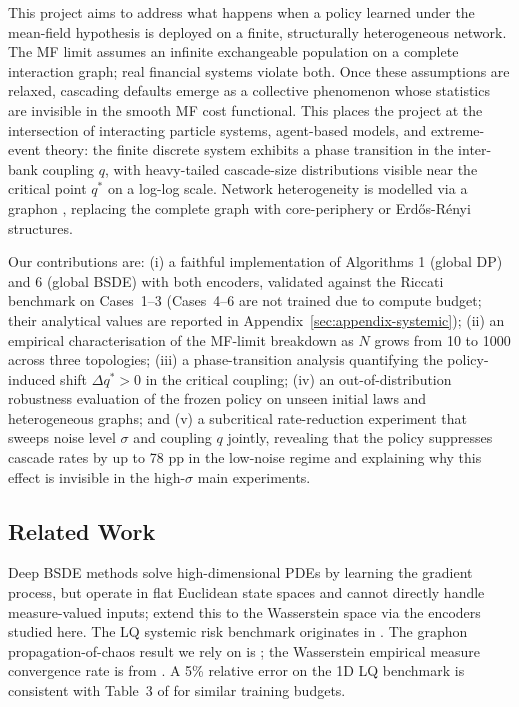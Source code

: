 \documentclass[11pt]{article}
\begin{document}
This project aims to address what happens when a policy learned under the mean-field hypothesis is deployed on a finite, structurally heterogeneous network. The MF limit assumes an infinite exchangeable population on a complete interaction graph; real financial systems violate both. Once these assumptions are relaxed, cascading defaults emerge as a collective phenomenon whose statistics are invisible in the smooth MF cost functional. This places the project at the intersection of interacting particle systems, agent-based models, and extreme-event theory: the finite discrete system exhibits a phase transition in the inter-bank coupling $q$, with heavy-tailed cascade-size distributions visible near the critical point $q^*$ on a log-log scale. Network heterogeneity is modelled via a graphon \citep{lovasz2012large}, replacing the complete graph with core-periphery or Erdős-Rényi structures.

Our contributions are: (i) a faithful implementation of Algorithms 1 (global DP) and 6 (global BSDE) with both encoders, validated against the Riccati benchmark on Cases~1--3 (Cases~4--6 are not trained due to compute budget; their analytical values are reported in Appendix~\ref{sec:appendix-systemic}); (ii) an empirical characterisation of the MF-limit breakdown as $N$ grows from 10 to 1000 across three topologies; (iii) a phase-transition analysis quantifying the policy-induced shift $\Delta q^* > 0$ in the critical coupling; (iv) an out-of-distribution robustness evaluation of the frozen policy on unseen initial laws and heterogeneous graphs; and (v) a subcritical rate-reduction experiment that sweeps noise level $\sigma$ and coupling $q$ jointly, revealing that the policy suppresses cascade rates by up to 78 pp in the low-noise regime and explaining why this effect is invisible in the high-$\sigma$ main experiments.

\subsection*{Related Work}
Deep BSDE methods \citep{han2018deep} solve high-dimensional PDEs by learning the gradient process, but operate in flat Euclidean state spaces and cannot directly handle measure-valued inputs; \citet{pham2024mfnn} extend this to the Wasserstein space via the encoders studied here. The LQ systemic risk benchmark originates in \citet{carmona2015systemic}. The graphon propagation-of-chaos result we rely on is \citet{coppini2025graphon}; the Wasserstein empirical measure convergence rate is from \citet{fournier2015rate}. A 5\% relative error on the 1D LQ benchmark is consistent with Table~3 of \citet{pham2024mfnn} for similar training budgets.
\end{document}
